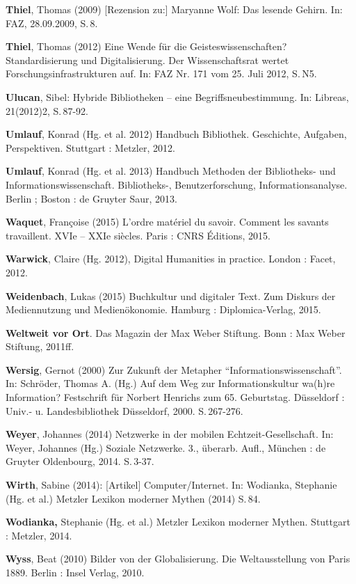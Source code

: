 \documentclass[a4paper,
fontsize=11pt,
oneside,
numbers=noperiodatend,
parskip=half-,
bibliography=totoc,
final
]{scrartcl}
\begin{document}
\textbf{Thiel}, Thomas (2009) {[}Rezension zu:{]} Maryanne Wolf: Das
lesende Gehirn. In: FAZ, 28.09.2009, S.\,8.

\textbf{Thiel}, Thomas (2012) Eine Wende für die Geisteswissenschaften?
Standardisierung und Digitalisierung. Der Wissenschaftsrat wertet
Forschungsinfrastrukturen auf. In: FAZ Nr. 171 vom 25. Juli 2012, S.\,N5.

\textbf{Ulucan}, Sibel: Hybride Bibliotheken -- eine
Begriffsneubestimmung. In: Libreas, 21(2012)2, S.\,87-92.

\textbf{Umlauf}, Konrad (Hg. et al. 2012) Handbuch Bibliothek.
Geschichte, Aufgaben, Perspektiven. Stuttgart : Metzler, 2012.

\textbf{Umlauf}, Konrad (Hg. et al. 2013) Handbuch Methoden der
Bibliotheks- und Informationswissenschaft. Bibliotheks-,
Benutzerforschung, Informationsanalyse. Berlin ; Boston : de Gruyter
Saur, 2013.

\textbf{Waquet}, Françoise (2015) L'ordre matériel du savoir. Comment
les savants travaillent. XVIe -- XXIe siècles. Paris : CNRS Éditions,
2015.

\textbf{Warwick}, Claire (Hg. 2012), Digital Humanities in practice.
London : Facet, 2012.

\textbf{Weidenbach}, Lukas (2015) Buchkultur und digitaler Text. Zum
Diskurs der Mediennutzung und Medienökonomie. Hamburg :
Diplomica-Verlag, 2015.

\textbf{Weltweit vor Ort}. Das Magazin der Max Weber Stiftung. Bonn :
Max Weber Stiftung, 2011ff.

\textbf{Wersig}, Gernot (2000) Zur Zukunft der Metapher
\enquote{Informationswissenschaft}. In: Schröder, Thomas A. (Hg.) Auf
dem Weg zur Informationskultur wa(h)re Information? Festschrift für
Norbert Henrichs zum 65. Geburtstag. Düsseldorf : Univ.- u.
Landesbibliothek Düsseldorf, 2000. S.\,267-276.

\textbf{Weyer}, Johannes (2014) Netzwerke in der mobilen
Echtzeit-Gesellschaft. In: Weyer, Johannes (Hg.) Soziale Netzwerke. 3.,
überarb. Aufl., München : de Gruyter Oldenbourg, 2014. S.\,3-37.

\textbf{Wirth}, Sabine (2014): {[}Artikel{]} Computer/Internet. In:
Wodianka, Stephanie (Hg. et al.) Metzler Lexikon moderner Mythen (2014)
S.\,84.

\textbf{Wodianka,} Stephanie (Hg. et al.) Metzler Lexikon moderner
Mythen. Stuttgart : Metzler, 2014.

\textbf{Wyss}, Beat (2010) Bilder von der Globalisierung. Die
Weltausstellung von Paris 1889. Berlin : Insel Verlag, 2010.
\end{document}
